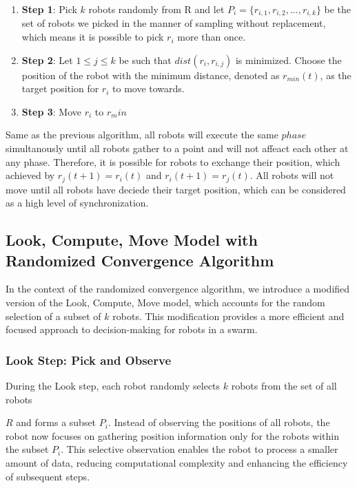 \documentclass[]{report}
\begin{document}
\begin{enumerate}
\item \textbf{Step 1}: Pick \(k\) robots randomly from R and let $P_i = \{r_{i,1},r_{i,2},...,r_{i,k}\}$ be the set of robots we picked in the manner of sampling without replacement, which means it is possible to pick \(r_i\) more than once. 
\item \textbf{Step 2}: Let $1\leq j \leq k$ be such that $dist(r_i,r_{i,j})$ is minimized. Choose the position of the robot with the minimum distance, denoted as \(r_{min}(t)\), as the target position for \(r_i\) to move towards.
\item \textbf{Step 3}: Move \(r_i\) to \(r_min\)
\end{enumerate}
Same as the previous algorithm, all robots will execute the same \(phase\) simultanously until all robots gather to a point and will not affeact each other at any phase. Therefore, it is possible for robots to exchange their position, which achieved by \(r_j(t + 1) = r_i(t)\) and \(r_i(t + 1) = r_j(t)\). All robots will not move until all robots have deciede their target position, which can be considered as a high level of synchronization.
\subsection{Look, Compute, Move Model with Randomized Convergence Algorithm}

In the context of the randomized convergence algorithm, we introduce a modified version of the Look, Compute, Move model, which accounts for the random selection of a subset of \(k\) robots. This modification provides a more efficient and focused approach to decision-making for robots in a swarm.

\subsubsection{Look Step: Pick and Observe}

During the Look step, each robot randomly selects \(k\) robots from the set of all robots 

\(R\) and forms a subset \(P_i\). Instead of observing the positions of all robots, the robot now focuses on gathering position information only for the robots within the subset \(P_i\). This selective observation enables the robot to process a smaller amount of data, reducing computational complexity and enhancing the efficiency of subsequent steps.
\end{document}
